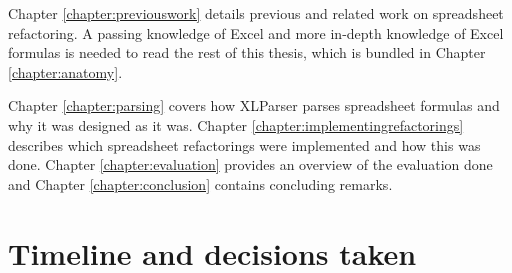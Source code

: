 Chapter \ref{chapter:previouswork} details previous and related work on spreadsheet refactoring.
A passing knowledge of Excel and more in-depth knowledge of Excel formulas is needed to read the rest of this thesis, which is bundled in Chapter \ref{chapter:anatomy}.

Chapter \ref{chapter:parsing} covers how XLParser parses spreadsheet formulas and why it was designed as it was.
Chapter \ref{chapter:implementingrefactorings} describes which spreadsheet refactorings were implemented and how this was done.
Chapter \ref{chapter:evaluation} provides an overview of the evaluation done and Chapter \ref{chapter:conclusion} contains concluding remarks.

\newpage

\section{Timeline and decisions taken}

